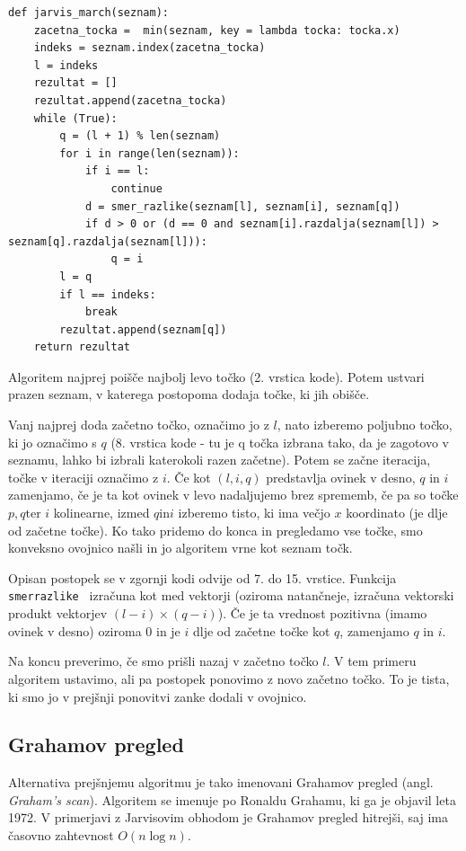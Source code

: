 \documentclass[a4paper]{article}
\begin{document}
\begin{lstlisting}
def jarvis_march(seznam):
    zacetna_tocka =  min(seznam, key = lambda tocka: tocka.x)
    indeks = seznam.index(zacetna_tocka) 
    l = indeks
    rezultat = []
    rezultat.append(zacetna_tocka)
    while (True):
        q = (l + 1) % len(seznam)      
        for i in range(len(seznam)):
            if i == l:
                continue
            d = smer_razlike(seznam[l], seznam[i], seznam[q])
            if d > 0 or (d == 0 and seznam[i].razdalja(seznam[l]) > seznam[q].razdalja(seznam[l])):
                q = i
        l = q
        if l == indeks:
            break    
        rezultat.append(seznam[q])
    return rezultat
\end{lstlisting}

Algoritem najprej poišče najbolj levo točko (2. vrstica kode). Potem ustvari prazen seznam, v katerega postopoma dodaja točke, ki jih obišče. 

Vanj najprej doda začetno točko, označimo jo z $l$, nato izberemo poljubno točko, ki jo označimo s $q$ (8. vrstica kode - tu je q točka izbrana tako, da je zagotovo v seznamu, 
lahko bi izbrali katerokoli razen začetne). Potem se začne iteracija, točke v iteraciji označimo z $i$. Če kot $(l,i,q)$ predstavlja ovinek v desno, $q$ in $i$ zamenjamo,
če je ta kot ovinek v levo nadaljujemo brez sprememb, če pa so točke $p,q\text{ter~}i$ kolinearne, izmed $q \text{in}i$ izberemo tisto, ki ima večjo $x$ koordinato
(je dlje od začetne točke). Ko tako pridemo do konca in pregledamo vse točke, smo konveksno ovojnico našli in jo algoritem vrne kot seznam točk. 

Opisan postopek se v zgornji kodi odvije od 7. do 15. vrstice. Funkcija \texttt{ smer\textunderscore razlike } izračuna kot med vektorji 
(oziroma natančneje, izračuna vektorski produkt vektorjev $(l - i)\times(q - i)$). Če je ta vrednost pozitivna (imamo ovinek v desno) oziroma 0 in je $i$ dlje od začetne točke kot $q$, zamenjamo $q$ in $i$. 

Na koncu preverimo, če smo prišli nazaj v začetno točko $l.$ V tem primeru algoritem ustavimo, ali pa postopek ponovimo z novo začetno točko. To je tista, ki smo jo
v prejšnji ponovitvi zanke dodali v ovojnico.

\subsection{Grahamov pregled}
Alternativa prejšnjemu algoritmu je tako imenovani Grahamov pregled (angl. \textit{Graham's scan}). Algoritem se imenuje po Ronaldu Grahamu, ki ga je objavil leta 1972. 
V primerjavi z Jarvisovim obhodom je Grahamov pregled hitrejši, saj ima časovno zahtevnost $O(n \log n)$.
\end{document}
